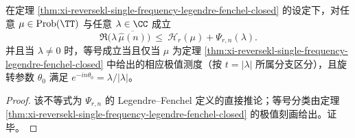 \begin{corollary}\label{cor:xi-reversekl-single-frequency-sharp-fenchel-inequality}
在定理 \ref{thm:xi-reversekl-single-frequency-legendre-fenchel-closed} 的设定下，对任意 \(\mu\in\mathrm{Prob}(\TT)\) 与任意 \(\lambda\in\CC\) 成立
\[
\boxed{\;
\Re\bigl(\lambda\,\overline{\widehat\mu(n)}\bigr)\ \le\ \mathcal H_r(\mu)+\Psi_{r,n}(\lambda).\;}
\]
并且当 \(\lambda\neq 0\) 时，等号成立当且仅当 \(\mu\) 为定理 \ref{thm:xi-reversekl-single-frequency-legendre-fenchel-closed} 中给出的相应极值测度（按 \(t=|\lambda|\) 所属分支区分），且旋转参数 \(\theta_0\) 满足 \(e^{-in\theta_0}=\lambda/|\lambda|\)。
\end{corollary}

\begin{proof}
该不等式为 \(\Psi_{r,n}\) 的 Legendre--Fenchel 定义的直接推论；等号分类由定理 \ref{thm:xi-reversekl-single-frequency-legendre-fenchel-closed} 的极值刻画给出。证毕。
\end{proof}
